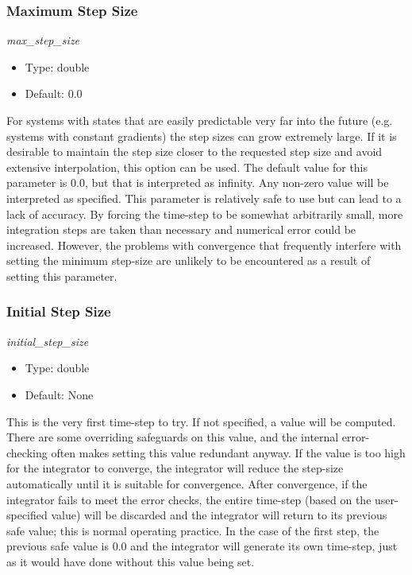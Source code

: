 \subsubsection{Maximum Step Size}
\textit{max\_step\_size}

\begin{itemize}
\item
Type: double
\item
Default: 0.0
\end{itemize}
For systems with states that are easily predictable very far into the
future (e.g. systems with constant gradients) the step sizes can grow
extremely large.  If it is desirable to maintain the step size closer
to the requested step size and avoid extensive interpolation, this option
can be used.
The default value for this parameter is 0.0, but that is interpreted as
infinity.  Any non-zero value will be interpreted as specified.
This parameter is relatively safe to use but can lead to a lack of accuracy.
 By forcing the time-step to be somewhat arbitrarily small, more integration
steps are taken than necessary and numerical error could be increased.
 However, the problems with convergence that frequently interfere with
setting the minimum step-size are unlikely to be encountered as a result
of setting this parameter.
\subsubsection{Initial Step Size}
\textit{initial\_step\_size}

\begin{itemize}
\item
Type: double
\item
Default: None
\end{itemize}
This is the very first time-step to try.  If not specified, a value will
be computed.
There are some overriding safeguards on this value, and the internal
error-checking
often makes setting this value redundant anyway.  If the value is too
high for the integrator to converge, the integrator will reduce the step-size
automatically until it is suitable for convergence.  After convergence,
if the integrator fails to meet the error checks, the entire time-step
(based on the user-specified value) will be discarded and the integrator
will return to its previous safe value; this is normal operating practice.
 In the case of the first step, the previous safe value is 0.0 and the
integrator will generate its own time-step, just as it would have done
without this value being set.

